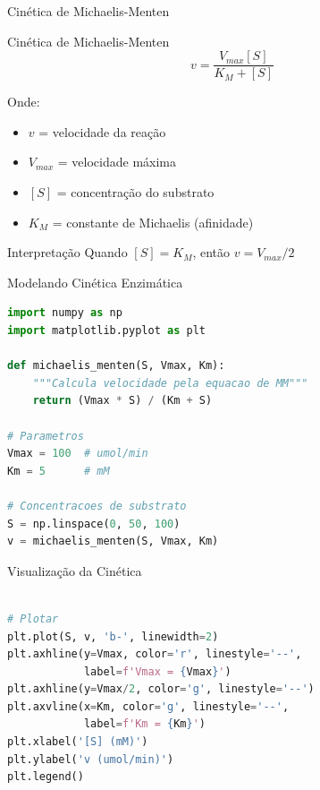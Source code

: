 \begin{frame}[allowframebreaks]{Cinética de Michaelis-Menten}

\begin{block}{Cinética de Michaelis-Menten}
\begin{equation*}
v = \frac{V_{max}[S]}{K_M + [S]}
\end{equation*}

Onde:
\begin{itemize}
    \item $v$ = velocidade da reação
    \item $V_{max}$ = velocidade máxima
    \item $[S]$ = concentração do substrato
    \item $K_M$ = constante de Michaelis (afinidade)
\end{itemize}
\end{block}

\begin{exampleblock}{Interpretação}
Quando $[S] = K_M$, então $v = V_{max}/2$
\end{exampleblock}
\end{frame}

\begin{frame}{Modelando Cinética Enzimática}
\begin{lstlisting}[language=Python, caption=Simulação de Michaelis-Menten, basicstyle=\ttfamily\footnotesize]
import numpy as np
import matplotlib.pyplot as plt

def michaelis_menten(S, Vmax, Km):
    """Calcula velocidade pela equacao de MM"""
    return (Vmax * S) / (Km + S)

# Parametros
Vmax = 100  # umol/min
Km = 5      # mM

# Concentracoes de substrato
S = np.linspace(0, 50, 100)
v = michaelis_menten(S, Vmax, Km)
\end{lstlisting}
\end{frame}

\begin{frame}[fragile]{Visualização da Cinética}
\begin{lstlisting}[language=Python, caption=Plotando resultados, basicstyle=\ttfamily\footnotesize]

# Plotar
plt.plot(S, v, 'b-', linewidth=2)
plt.axhline(y=Vmax, color='r', linestyle='--',
            label=f'Vmax = {Vmax}')
plt.axhline(y=Vmax/2, color='g', linestyle='--')
plt.axvline(x=Km, color='g', linestyle='--',
            label=f'Km = {Km}')
plt.xlabel('[S] (mM)')
plt.ylabel('v (umol/min)')
plt.legend()
\end{lstlisting}
\end{frame}

